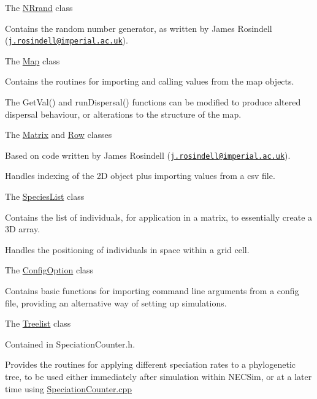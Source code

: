 \begin{DoxyItemize}
\begin{DoxyItemize}
\end{DoxyItemize}
\item The {\ttfamily \hyperlink{class_n_rrand}{N\+Rrand}} class
\begin{DoxyItemize}
\item Contains the random number generator, as written by James Rosindell (\href{mailto:j.rosindell@imperial.ac.uk}{\tt j.\+rosindell@imperial.\+ac.\+uk}).
\end{DoxyItemize}
\item The {\ttfamily \hyperlink{class_map}{Map}} class
\begin{DoxyItemize}
\item Contains the routines for importing and calling values from the map objects.
\item The {\ttfamily Get\+Val()} and {\ttfamily run\+Dispersal()} functions can be modified to produce altered dispersal behaviour, or alterations to the structure of the map.
\end{DoxyItemize}
\item The {\ttfamily \hyperlink{class_matrix}{Matrix}} and {\ttfamily \hyperlink{class_row}{Row}} classes
\begin{DoxyItemize}
\item Based on code written by James Rosindell (\href{mailto:j.rosindell@imperial.ac.uk}{\tt j.\+rosindell@imperial.\+ac.\+uk}).
\item Handles indexing of the 2D object plus importing values from a csv file.
\end{DoxyItemize}
\item The {\ttfamily \hyperlink{class_species_list}{Species\+List}} class
\begin{DoxyItemize}
\item Contains the list of individuals, for application in a matrix, to essentially create a 3D array.
\item Handles the positioning of individuals in space within a grid cell.
\end{DoxyItemize}
\item The {\ttfamily \hyperlink{class_config_option}{Config\+Option}} class
\begin{DoxyItemize}
\item Contains basic functions for importing command line arguments from a config file, providing an alternative way of setting up simulations.
\end{DoxyItemize}
\item The {\ttfamily \hyperlink{class_treelist}{Treelist}} class
\begin{DoxyItemize}
\item Contained in Speciation\+Counter.\+h.
\item Provides the routines for applying different speciation rates to a phylogenetic tree, to be used either immediately after simulation within N\+E\+C\+Sim, or at a later time using \hyperlink{_speciation_counter_8cpp}{Speciation\+Counter.\+cpp}
\end{DoxyItemize}
\end{DoxyItemize}

